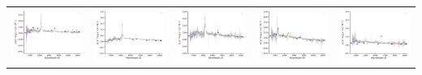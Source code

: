 \begin{center}
\begin{longtable}{l l l l l }
    \includegraphics[width=0.2\linewidth, clip]{Figs/Figs-sdss/spec-3777-55210-0616-SPLUS-n02s25-003956.pdf} & \includegraphics[width=0.2\linewidth, clip]{Figs/Figs-sdss/spec-3842-55565-0582-SPLUS-n02n20-021184.pdf} & \includegraphics[width=0.2\linewidth, clip]{Figs/Figs-sdss/spec-3845-55323-0406-SPLUS-n01s24-009687.pdf} & \includegraphics[width=0.2\linewidth, clip]{Figs/Figs-sdss/spec-3847-55588-0744-SPLUS-n02n27-026395.pdf} & \includegraphics[width=0.2\linewidth, clip]{Figs/Figs-sdss/spec-3847-55588-0794-SPLUS-n02n27-022071.pdf} \\

\end{longtable}
\end{center}
